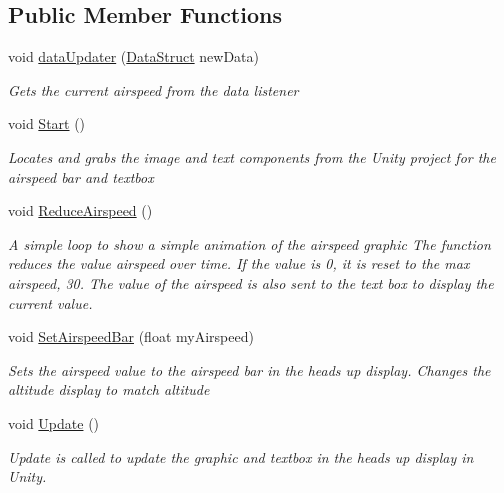 \subsection*{Public Member Functions}
\begin{DoxyCompactItemize}
\item 
void \hyperlink{class_airspeed_a19e789a2ca2668e1be21d2f3d7ca0b4a}{data\+Updater} (\hyperlink{class_data_struct}{Data\+Struct} new\+Data)
\begin{DoxyCompactList}\small\item\em Gets the current airspeed from the data listener \end{DoxyCompactList}\item 
void \hyperlink{class_airspeed_ab6fa5e94d6a823bd114762492703db7a}{Start} ()
\begin{DoxyCompactList}\small\item\em Locates and grabs the image and text components from the Unity project for the airspeed bar and textbox \end{DoxyCompactList}\item 
void \hyperlink{class_airspeed_a865cbdbf55eeee710e499959cdade3e8}{Reduce\+Airspeed} ()
\begin{DoxyCompactList}\small\item\em A simple loop to show a simple animation of the airspeed graphic The function reduces the value airspeed over time. If the value is 0, it is reset to the max airspeed, 30. The value of the airspeed is also sent to the text box to display the current value. \end{DoxyCompactList}\item 
void \hyperlink{class_airspeed_aaa534aa23041db361ee0fa4505a3a25f}{Set\+Airspeed\+Bar} (float my\+Airspeed)
\begin{DoxyCompactList}\small\item\em Sets the airspeed value to the airspeed bar in the heads up display. Changes the altitude display to match altitude \end{DoxyCompactList}\item 
void \hyperlink{class_airspeed_a8c1545c6073d8fb71f1280991b41f805}{Update} ()
\begin{DoxyCompactList}\small\item\em Update is called to update the graphic and textbox in the heads up display in Unity. \end{DoxyCompactList}\end{DoxyCompactItemize}
